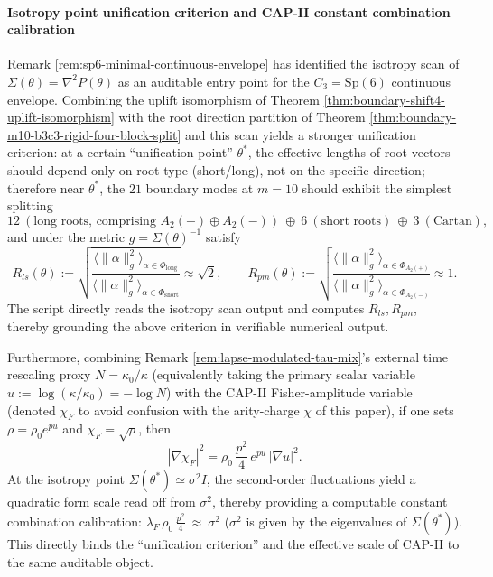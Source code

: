 \paragraph{Isotropy point unification criterion and CAP-II constant combination calibration}
Remark \ref{rem:sp6-minimal-continuous-envelope} has identified the isotropy scan of \(\Sigma(\theta)=\nabla^2P(\theta)\) as an auditable entry point for the \(C_3=\mathrm{Sp}(6)\) continuous envelope.
Combining the uplift isomorphism of Theorem \ref{thm:boundary-shift4-uplift-isomorphism} with the root direction partition of Theorem \ref{thm:boundary-m10-b3c3-rigid-four-block-split} and this scan yields a stronger unification criterion: at a certain ``unification point'' \(\theta^*\), the effective lengths of root vectors should depend only on root type (short/long), not on the specific direction; therefore near \(\theta^*\), the \(21\) boundary modes at \(m=10\) should exhibit the simplest splitting
\[
12\ (\text{long roots, comprising }A_2(+)\oplus A_2(-))\ \oplus\ 6\ (\text{short roots})\ \oplus\ 3\ (\text{Cartan}),
\]
and under the metric \(g=\Sigma(\theta)^{-1}\) satisfy
\[
R_{ls}(\theta):=\sqrt{\frac{\langle\|\alpha\|^2_g\rangle_{\alpha\in\Phi_{\mathrm{long}}}}{\langle\|\alpha\|^2_g\rangle_{\alpha\in\Phi_{\mathrm{short}}}}}
\approx \sqrt{2},\qquad
R_{pm}(\theta):=\sqrt{\frac{\langle\|\alpha\|^2_g\rangle_{\alpha\in\Phi_{A_2(+)}}}{\langle\|\alpha\|^2_g\rangle_{\alpha\in\Phi_{A_2(-)}}}}
\approx 1.
\]
The script \texttt{} directly reads the isotropy scan output
\texttt{} and computes \(R_{ls},R_{pm}\), thereby grounding the above criterion in verifiable numerical output.
\par
Furthermore, combining Remark \ref{rem:lapse-modulated-tau-mix}'s external time rescaling proxy \(N=\kappa_0/\kappa\) (equivalently taking the primary scalar variable \(u:=\log(\kappa/\kappa_0)=-\log N\)) with the CAP-II Fisher-amplitude variable (denoted \(\chi_F\) to avoid confusion with the arity-charge \(\chi\) of this paper),
if one sets \(\rho=\rho_0 e^{p u}\) and \(\chi_F=\sqrt{\rho}\), then
\[
|\nabla\chi_F|^2=\rho_0\,\frac{p^2}{4}\,e^{p u}\,|\nabla u|^2.
\]
At the isotropy point \(\Sigma(\theta^*)\simeq\sigma^2 I\), the second-order fluctuations yield a quadratic form scale read off from \(\sigma^2\), thereby providing a computable constant combination calibration:
\(
\lambda_F\,\rho_0\,\frac{p^2}{4}\ \approx\ \sigma^2
\)
(\(\sigma^2\) is given by the eigenvalues of \(\Sigma(\theta^*)\)). This directly binds the ``unification criterion'' and the effective scale of CAP-II to the same auditable object.

